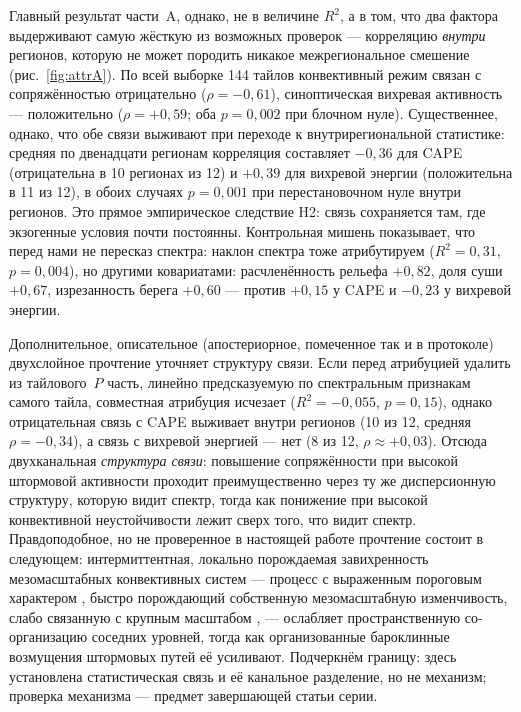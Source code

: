 \documentclass[11pt,a4paper]{article}
\begin{document}
Главный результат части~A, однако, не в величине $R^2$, а в том, что два фактора выдерживают самую жёсткую из возможных проверок --- корреляцию \emph{внутри} регионов, которую не может породить никакое межрегиональное смешение (рис.~\ref{fig:attrA}). По всей выборке 144 тайлов конвективный режим связан с сопряжённостью отрицательно ($\rho=-0{,}61$), синоптическая вихревая активность --- положительно ($\rho=+0{,}59$; оба $p=0{,}002$ при блочном нуле). Существеннее, однако, что обе связи выживают при переходе к внутрирегиональной статистике: средняя по двенадцати регионам корреляция составляет $-0{,}36$ для CAPE (отрицательна в 10 регионах из 12) и $+0{,}39$ для вихревой энергии (положительна в 11 из 12), в обоих случаях $p=0{,}001$ при перестановочном нуле внутри регионов. Это прямое эмпирическое следствие H2: связь сохраняется там, где экзогенные условия почти постоянны. Контрольная мишень показывает, что перед нами не пересказ спектра: наклон спектра тоже атрибутируем ($R^2=0{,}31$, $p=0{,}004$), но другими ковариатами: расчленённость рельефа $+0{,}82$, доля суши $+0{,}67$, изрезанность берега $+0{,}60$ --- против $+0{,}15$ у CAPE и $-0{,}23$ у вихревой энергии.

Дополнительное, описательное (апостериорное, помеченное так и в протоколе) двухслойное прочтение уточняет структуру связи. Если перед атрибуцией удалить из тайлового~$P$ часть, линейно предсказуемую по спектральным признакам самого тайла, совместная атрибуция исчезает ($R^2=-0{,}055$, $p=0{,}15$), однако отрицательная связь с CAPE выживает внутри регионов (10 из 12, средняя $\rho=-0{,}34$), а связь с вихревой энергией --- нет (8 из 12, $\rho\approx+0{,}03$). Отсюда двухканальная \emph{структура связи}: повышение сопряжённости при высокой штормовой активности проходит преимущественно через ту же дисперсионную структуру, которую видит спектр, тогда как понижение при высокой конвективной неустойчивости лежит сверх того, что видит спектр. Правдоподобное, но не проверенное в настоящей работе прочтение состоит в следующем: интермиттентная, локально порождаемая завихренность мезомасштабных конвективных систем \cite{Houze2004,Feng2021} --- процесс с выраженным пороговым характером \cite{PetersNeelin2006}, быстро порождающий собственную мезомасштабную изменчивость, слабо связанную с крупным масштабом \cite{Zhang2007,RotunnoSnyder2008,Judt2020}, --- ослабляет пространственную со-организацию соседних уровней, тогда как организованные бароклинные возмущения штормовых путей её усиливают. Подчеркнём границу: здесь установлена статистическая связь и её канальное разделение, но не механизм; проверка механизма --- предмет завершающей статьи серии.
\end{document}
